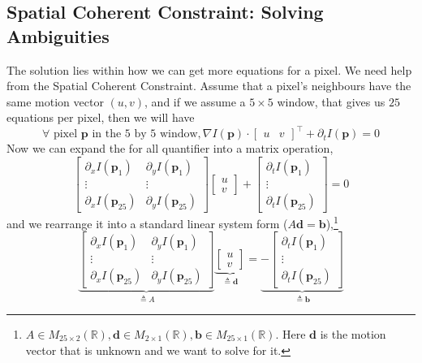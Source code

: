 \documentclass[11pt]{article}
\newcommand{\bb}{\mathbf{b}}
\newcommand{\bd}{\mathbf{d}}
\newcommand{\bp}{\mathbf{p}}
\newcommand{\R}{\mathbb{R}}
\newcommand{\mat}[2]{M_{#1 \times #2}(\R)}
\begin{document}
\subsection{Spatial Coherent Constraint: Solving Ambiguities}
The solution lies within how we can get more equations for a pixel. We need help from the Spatial Coherent Constraint. Assume that a pixel's neighbours have the same motion vector $(u, v)$, and if we assume a $5\times 5$ window, that gives us $25$ equations per pixel, then we will have
\begin{equation}
	\forall \,\,\text{pixel $\bp$ in the 5 by 5 window}, \nabla I (\bp) \cdot \begin{bmatrix}
		u & v
	\end{bmatrix}^\top + \partial_t I (\bp) = 0
\end{equation}
Now we can expand the for all quantifier into a matrix operation, 
\begin{equation}
	\begin{bmatrix}
		\partial_x I (\bp_1) & \partial_y I (\bp_1) \\
		\vdots & \vdots \\
		\partial_x I (\bp_{25}) & \partial_y I (\bp_{25})
	\end{bmatrix} \begin{bmatrix}
		u \\ v
	\end{bmatrix} + \begin{bmatrix}
		\partial_t I (\bp_1) \\
		\vdots \\
		\partial_t I (\bp_{25})
	\end{bmatrix} = 0 
\end{equation}
and we rearrange it into a standard linear system form ($A \bd = \bb$),\footnote{$A\in \mat{25}{2}, \bd \in \mat{2}{1}, \bb \in \mat{25}{1}$. Here $\bd$ is the motion vector that is unknown and we want to solve for it. }
\begin{equation}
	\underbrace{\begin{bmatrix}
		\partial_x I (\bp_1) & \partial_y I (\bp_1) \\
		\vdots & \vdots \\
		\partial_x I (\bp_{25}) & \partial_y I (\bp_{25})
	\end{bmatrix}}_{\triangleq A} \underbrace{\begin{bmatrix}
		u \\ v
	\end{bmatrix}} _{\triangleq \bd} = \underbrace{- \begin{bmatrix}
		\partial_t I (\bp_1) \\
		\vdots \\
		\partial_t I (\bp_{25})
	\end{bmatrix}}_{\triangleq \bb}
\end{equation}
\end{document}
